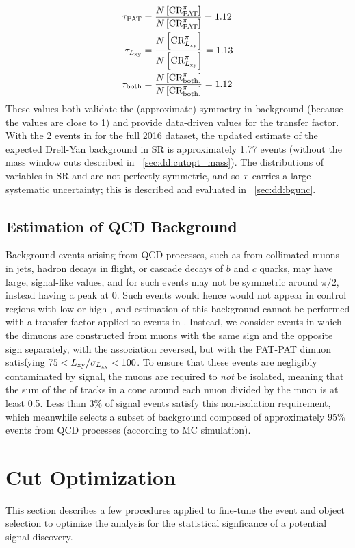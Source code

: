 \begin{align}
  \tau_\text{PAT}  &= \frac{N\left[\text{CR}_\text{PAT}^{\pi}\right]}{N\left[\text{CR}_\text{PAT}^{\pi}\right]} = 1.12 \\
  \tau_\text{\ensuremath{L_{\mathrm{xy}}}} &= \frac{N\left[\text{CR}_\text{\ensuremath{L_{\mathrm{xy}}}}^{\pi}\right]}{N\left[\text{CR}_\text{\ensuremath{L_{\mathrm{xy}}}}^{\pi}\right]} = 1.13 \\
  \tau_\text{both} &= \frac{N\left[\text{CR}_\text{both}^{\pi}\right]}{N\left[\text{CR}_\text{both}^{\pi}\right]} = 1.12
  \label{eq:dd:transferfactors}
\end{align}
These values both validate the (approximate) symmetry in background (because the values are close to 1) and provide data-driven values for the transfer factor.
With the 2 events in \CR{ }{\pi} for the full 2016 dataset, the updated estimate of the expected Drell-Yan background in SR is approximately 1.77 events (without the mass window cuts described in \Sec~\ref{sec:dd:cutopt_mass}).
The distributions of variables in SR and \CR{ }{\pi} are not perfectly symmetric, and so $\tau$ carries a large systematic uncertainty; this is described and evaluated in \Sec~\ref{sec:dd:bgunc}.

\subsection{Estimation of QCD Background}
Background events arising from QCD processes, such as from collimated muons in jets, hadron decays in flight, or cascade decays of $b$ and $c$ quarks, may have large, signal-like \LxySig values, and \DeltaPhi for such events may not be symmetric around $\pi/2$, instead having a peak at 0.
Such events would hence would not appear in control regions with low \LxySig or high \DeltaPhi, and estimation of this background cannot be performed with a transfer factor applied to events in \CR{ }{\pi}.
Instead, we consider events in which the dimuons are constructed from muons with the same sign and the opposite sign separately, with the \DSAToPAT association reversed, but with the PAT-PAT dimuon satisfying $75 < L_{\mathrm{xy}}/\sigma_{L_{\mathrm{xy}}} < 100$.
To ensure that these events are negligibly contaminated by signal, the muons are required to \emph{not} be isolated, meaning that the sum of the \pT of tracks in a \DeltaR cone around each muon divided by the muon \pT is at least 0.5.
Less than 3\% of \twoMu signal events satisfy this non-isolation requirement, which meanwhile selects a subset of background composed of approximately 95\% events from QCD processes (according to MC simulation).

\section{Cut Optimization}
This section describes a few procedures applied to fine-tune the event and object selection to optimize the analysis for the statistical signficance of a potential signal discovery.

